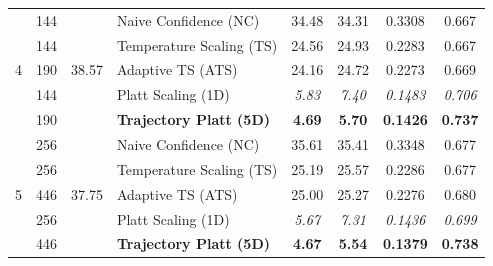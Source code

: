 \begin{table}[t]
{\begin{tabular}{ccclcccc}
\midrule
\multirow{5}{*}{4} & 144 & \multirow{5}{*}{38.57} & Naive Confidence (NC) & 34.48 & 34.31 & 0.3308 & 0.667 \\
 & 144 &  & Temperature Scaling (TS) & 24.56 & 24.93 & 0.2283 & 0.667 \\
 & 190 &  & Adaptive TS (ATS) & 24.16 & 24.72 & 0.2273 & 0.669 \\
 & 144 &  & Platt Scaling (1D) & \textit{5.83} & \textit{7.40} & \textit{0.1483} & \textit{0.706} \\
 & 190 &  & \textbf{Trajectory Platt (5D)} & \textbf{4.69} & \textbf{5.70} & \textbf{0.1426} & \textbf{0.737} \\
\midrule
\multirow{5}{*}{5} & 256 & \multirow{5}{*}{37.75} & Naive Confidence (NC) & 35.61 & 35.41 & 0.3348 & 0.677 \\
 & 256 &  & Temperature Scaling (TS) & 25.19 & 25.57 & 0.2286 & 0.677 \\
 & 446 &  & Adaptive TS (ATS) & 25.00 & 25.27 & 0.2276 & 0.680 \\
 & 256 &  & Platt Scaling (1D) & \textit{5.67} & \textit{7.31} & \textit{0.1436} & \textit{0.699} \\
 & 446 &  & \textbf{Trajectory Platt (5D)} & \textbf{4.67} & \textbf{5.54} & \textbf{0.1379} & \textbf{0.738} \\
\bottomrule
\end{tabular}%
}
\end{table}
